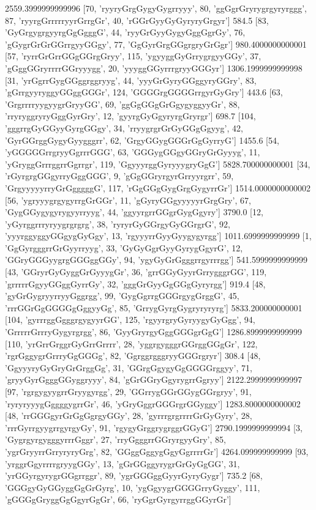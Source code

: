 2559.3999999999996 [70, 'ryyryGrgGygyGygrryyy', 80, 'ggGgrGryrygrgyryrggg', 87, 'ryyrgGrrrrryyrGrrgGr', 40, 'rGGrGyyGyGyryryGrgyr']
584.5 [83, 'GyGrgygrgyyrgGgGgggG', 44, 'ryyGrGyyGygyGggGgrGy', 76, 'gGygrGrGrGGrrgyyGGgy', 77, 'GgGyrGrgGGgrgryGrGgr']
980.4000000000001 [57, 'ryrrGrGrrGGgGGrgGryy', 115, 'ygyyggGyGrrygrgyyGGy', 37, 'gGggGGryrrrrGGryyygg', 20, 'yyyggGGyrrrgryyGGGyr']
1306.1999999999998 [31, 'yrGgrrGygGGggrggryyg', 44, 'yyyGrGyryGGggyryGGry', 83, 'gGrrgyyryggyGGggGGGr', 124, 'GGGGrgGGGGrrgyrGyGry']
443.6 [63, 'GrgrrrryygyygrGryyGG', 69, 'ggGgGGgGrGgygyggyyGr', 88, 'rryryggryryGggGyrGry', 12, 'gyyrgGyGgyryrgGryrgr']
698.7 [104, 'gggrrgGyGGyyGyrgGGgy', 34, 'rryygrgrGrGyGGgGgyyg', 42, 'GyrGGrggGygyGyygggrr', 62, 'GrgyGGygGGGrGgGyrryG']
1455.6 [54, 'yGGGGGrrgryyGgrrrGGG', 63, 'GGGygGGgyGGryGrGyyyg', 11, 'yGryggGrrrggrrGgrrgr', 119, 'GgyyyrggGyryyygryGgG']
5828.700000000001 [34, 'rGyrgrgGGgyrryGggGGG', 9, 'gGgGGryrgyrGrryyrgrr', 59, 'GrgyyyyyrryGrGgggggG', 117, 'rGgGGgGygGrgGygyrrGr']
1514.0000000000002 [56, 'ygryyygrgygyrrgGrGGr', 11, 'gGyryGGgyyyyyrGrgGry', 67, 'GygGGygygyrygyyrryyg', 44, 'ggyyrgrrGGgrGygGgyry']
3790.0 [12, 'yGyrggrrryryygrgrgrg', 38, 'ryryrGyGGrgyGyGGrgrG', 92, 'yyyrggyggyGGgygGyGgy', 13, 'rgyyyrrGyyGyygygyrgg']
1011.6999999999999 [1, 'GgGyrgggrrGrGyyrryyg', 33, 'GyGyGgrGyyGyrygGgyrG', 12, 'GGryGGGyygrgGGGggGGy', 94, 'ygyGyGrGgggrrgyrrrgg']
541.5999999999999 [43, 'GGryrGyGyggGrGyyygGr', 36, 'grrGGyGyyrGrrygggrGG', 119, 'grrrrrGgyyGGggGyrrGy', 32, 'gggGrGyyGgGGgGyryrgg']
919.4 [48, 'gyGrGygryyrryyGggrgg', 99, 'GygGgrrgGGGrgygGrggG', 45, 'rrrGGrGgGGGGgGggyyGg', 85, 'GrrygGyrgGygryryryrg']
5833.200000000001 [104, 'gyrrrggGgggrgygyyrGG', 125, 'rgyyrgryGyryygyGyGgg', 94, 'GrrrrrGrrryGygyrgrgg', 86, 'GyyGryrgyGggGGGgrGgG']
1286.8999999999999 [110, 'yrGrrGrggrGyGrrGrrrr', 28, 'yggrgygggrGGrggGGgGr', 122, 'rgrGggygrGrrryGgGGGg', 82, 'GgrggrgggryyGGGrgryr']
308.4 [48, 'GgyyyryGyGryGrGrggGg', 31, 'GGrgGgygyGgGGGGrggyy', 71, 'gryyGyrGgggGGyggryyy', 84, 'gGrGGryGgyrygrrGgryy']
2122.2999999999997 [97, 'rgrgygyygrrGryygyrgg', 29, 'GGrrygGGrGGygGGrgryy', 91, 'ryryryyygGggggygrrGr', 46, 'yGryGggrGGGrgrGGyggy']
1283.8000000000002 [48, 'rrGGGgyrGrGgGgrgyGGy', 28, 'gyrrrgrgrrrrGrGyGyry', 28, 'rrrGyrrgyygrrgyrgyGy', 91, 'rgygyGrggrygrggrGGyG']
2790.1999999999994 [3, 'GygrgyrgygggyrrrGggr', 27, 'rryGgggrrGGryrgyyGry', 85, 'ygrGryyrrGrryryryGrg', 82, 'GGggGggygGgyGgrrrrGr']
4264.099999999999 [93, 'yrggrGgyrrrrgryygGGy', 13, 'gGrGGggyrygrGrGyGgGG', 31, 'yrGGyrgyrygrGGgrrggr', 89, 'ygrGGGggGyyrGyryGygr']
735.2 [68, 'GGGgyGyGGyggGgGrGyrg', 10, 'ygGgyygrGGGGrryGyggy', 111, 'gGGGgGryggGgGgyrGgGr', 66, 'ryGgrGyrgyrrggGGyrGr']
